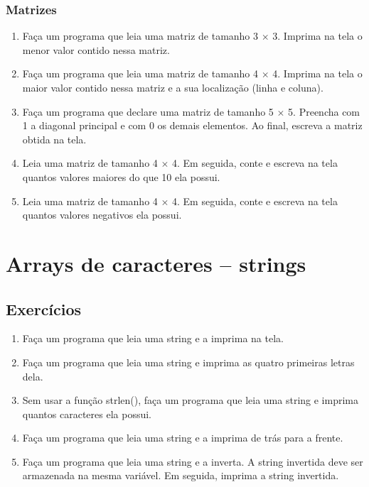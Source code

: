 \documentclass[a4paper,10pt]{article}
\begin{document}
\begin{multicols*}{2}
\subsubsection{Matrizes}

\setlength{\leftmargini}{0pt}
\begin{enumerate}
  \item Faça um programa que leia uma matriz de tamanho 3 $\times$ 3. Imprima na tela o menor valor contido nessa matriz.
  \item Faça um programa que leia uma matriz de tamanho 4 $\times$ 4. Imprima na tela o maior valor contido nessa matriz e a sua localização (linha e coluna).
  \item Faça um programa que declare uma matriz de tamanho 5 $\times$ 5. Preencha com 1 a diagonal principal e com 0 os demais elementos. Ao final, escreva a matriz obtida na tela.
  \item Leia uma matriz de tamanho 4 $\times$ 4. Em seguida, conte e escreva na tela quantos valores maiores do que 10 ela possui.
  \item Leia uma matriz de tamanho 4 $\times$ 4. Em seguida, conte e escreva na tela quantos valores negativos ela possui.
\end{enumerate}

\section{Arrays de caracteres – strings}

\setcounter{subsection}{3}
\subsection{Exercícios}

\setlength{\leftmargini}{0pt}
\begin{enumerate}
  \item Faça um programa que leia uma string e a imprima na tela.
  \item Faça um programa que leia uma string e imprima as quatro primeiras letras dela.
  \item Sem usar a função strlen(), faça um programa que leia uma string e imprima quantos caracteres ela possui.
  \item Faça um programa que leia uma string e a imprima de trás para a frente.
  \item Faça um programa que leia uma string e a inverta. A string invertida deve ser armazenada na mesma variável. Em seguida, imprima a string invertida.
\end{enumerate}


\end{multicols*}
\end{document}
